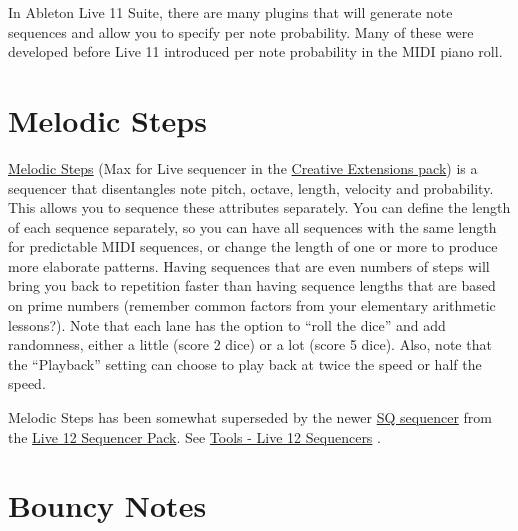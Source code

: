 \documentclass[
  12pt,
  letterpaper,
  oneside,
  open=any]{scrbook}
\makeatletter
\newcommand*\pandocbounded[1]{%
  \sbox\pandoc@box{#1}%
  \Gscale@div\@tempa{\textheight}{\dimexpr\ht\pandoc@box+\dp\pandoc@box\relax}%
  \Gscale@div\@tempb{\linewidth}{\wd\pandoc@box}%
  \ifdim\@tempb\p@<\@tempa\p@\let\@tempa\@tempb\fi%
  \ifdim\@tempa\p@<\p@\scalebox{\@tempa}{\usebox\pandoc@box}%
  \else\usebox{\pandoc@box}%
  \fi%
}
\makeatother
\begin{document}
In Ableton Live 11 Suite, there are many plugins that will generate note
sequences and allow you to specify per note probability. Many of these
were developed before Live 11 introduced per note probability in the
MIDI piano roll.

\section{Melodic Steps}\label{melodic-steps}

\href{https://www.youtube.com/watch?v=ev2GgU1D8jw}{Melodic Steps} (Max
for Live sequencer in the
\href{https://www.ableton.com/en/packs/creative-extensions/}{Creative
Extensions pack}) is a sequencer that disentangles note pitch, octave,
length, velocity and probability. This allows you to sequence these
attributes separately. You can define the length of each sequence
separately, so you can have all sequences with the same length for
predictable MIDI sequences, or change the length of one or more to
produce more elaborate patterns. Having sequences that are even numbers
of steps will bring you back to repetition faster than having sequence
lengths that are based on prime numbers (remember common factors from
your elementary arithmetic lessons?). Note that each lane has the option
to ``roll the dice'' and add randomness, either a little (score 2 dice)
or a lot (score 5 dice). Also, note that the ``Playback'' setting can
choose to play back at twice the speed or half the speed.

Melodic Steps has been somewhat superseded by the newer
\href{https://www.youtube.com/watch?v=1obXGz-Zfa8}{SQ sequencer} from
the \href{https://www.ableton.com/en/packs/sequencers}{Live 12 Sequencer
Pack}. See \hyperref[031-Tools-Live12_Sequencers]{Tools - Live 12
Sequencers} .

\pandocbounded{\texttt{[image: images/Melodic\_Steps.png]}}

\section{Bouncy Notes}\label{bouncy-notes}
\end{document}
